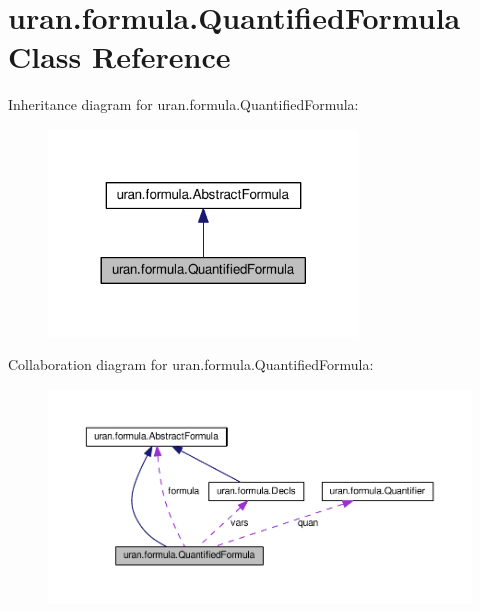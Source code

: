 \hypertarget{classuran_1_1formula_1_1_quantified_formula}{}\section{uran.\+formula.\+Quantified\+Formula Class Reference}
\label{classuran_1_1formula_1_1_quantified_formula}


Inheritance diagram for uran.\+formula.\+Quantified\+Formula\+:
\nopagebreak
\begin{figure}[H]
\begin{center}
\leavevmode
\includegraphics[width=233pt]{classuran_1_1formula_1_1_quantified_formula__inherit__graph}
\end{center}
\end{figure}


Collaboration diagram for uran.\+formula.\+Quantified\+Formula\+:
\nopagebreak
\begin{figure}[H]
\begin{center}
\leavevmode
\includegraphics[width=350pt]{classuran_1_1formula_1_1_quantified_formula__coll__graph}
\end{center}
\end{figure}
